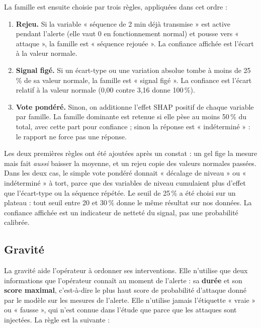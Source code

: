 La famille est ensuite choisie par trois règles, appliquées dans cet ordre :

\begin{enumerate}
  \item \textbf{Rejeu.} Si la variable « séquence de 2 min déjà transmise » est
        active pendant l'alerte (elle vaut 0 en fonctionnement normal) et pousse
        vers « attaque », la famille est « séquence rejouée ». La confiance
        affichée est l'écart à la valeur normale.
  \item \textbf{Signal figé.} Si un écart-type ou une variation absolue tombe à
        moins de 25\,\% de sa valeur normale, la famille est « signal figé ». La
        confiance est l'écart relatif à la valeur normale (0,00 contre 3,16
        donne 100\,\%).
  \item \textbf{Vote pondéré.} Sinon, on additionne l'effet SHAP positif de
        chaque variable par famille. La famille dominante est retenue si elle
        pèse au moins 50\,\% du total, avec cette part pour confiance ; sinon la
        réponse est « indéterminé » : le rapport ne force pas une réponse.
\end{enumerate}

Les deux premières règles ont été ajoutées après un constat : un gel fige la
mesure mais fait \emph{aussi} baisser la moyenne, et un rejeu copie des valeurs
normales passées. Dans les deux cas, le simple vote pondéré donnait « décalage
de niveau » ou « indéterminé » à tort, parce que des variables de niveau
cumulaient plus d'effet que l'écart-type ou la séquence répétée. Le seuil de
25\,\% a été choisi sur un plateau : tout seuil entre 20 et 30\,\% donne le même
résultat sur nos données. La confiance affichée est un indicateur de netteté du
signal, pas une probabilité calibrée.

\subsection{Gravité}

La gravité aide l'opérateur à ordonner ses interventions. Elle n'utilise que
deux informations que l'opérateur connaît au moment de l'alerte : sa
\textbf{durée} et son \textbf{score maximal}, c'est-à-dire le plus haut score de
probabilité d'attaque donné par le modèle sur les mesures de l'alerte. Elle
n'utilise jamais l'étiquette « vraie » ou « fausse », qui n'est connue dans
l'étude que parce que les attaques sont injectées. La règle est la suivante :

